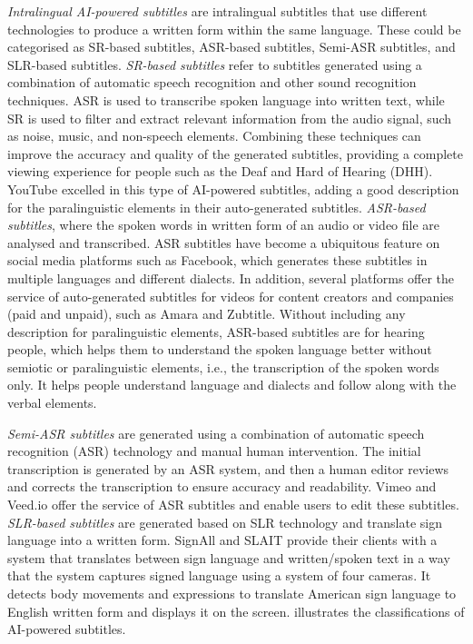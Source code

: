 \documentclass[english]{textolivre}
\begin{document}
\emph{Intralingual AI-powered subtitles} are intralingual subtitles that
use different technologies to produce a written form within the same
language. These could be categorised as SR-based subtitles, ASR-based
subtitles, Semi-ASR subtitles, and SLR-based subtitles. \emph{SR-based
	subtitles} refer to subtitles generated using a combination of automatic
speech recognition and other sound recognition techniques. ASR is used
to transcribe spoken language into written text, while SR is used to
filter and extract relevant information from the audio signal, such as
noise, music, and non-speech elements. Combining these techniques can
improve the accuracy and quality of the generated subtitles, providing a
complete viewing experience for people such as the Deaf and Hard of
Hearing (DHH). YouTube excelled in this type of AI-powered subtitles,
adding a good description for the paralinguistic elements in their
auto-generated subtitles. \emph{ASR-based subtitles}, where the
spoken words in written form of an audio or video file are analysed and
transcribed. ASR subtitles have become a ubiquitous feature on social
media platforms such as Facebook, which generates these subtitles in
multiple languages and different dialects. In addition, several
platforms offer the service of auto-generated subtitles for videos for
content creators and companies (paid and unpaid), such as Amara and
Zubtitle. Without including any description for paralinguistic elements,
ASR-based subtitles are for hearing people, which helps them to
understand the spoken language better without semiotic or paralinguistic
elements, i.e., the transcription of the spoken words only. It helps
people understand language and dialects and follow along with the verbal
elements.

\emph{Semi-ASR subtitles} are generated using a combination of automatic
speech recognition (ASR) technology and manual human intervention. The
initial transcription is generated by an ASR system, and then a human
editor reviews and corrects the transcription to ensure accuracy and
readability. Vimeo and Veed.io offer the service of ASR subtitles and
enable users to edit these subtitles. \emph{SLR-based subtitles} are
generated based on SLR technology and translate sign language into a
written form. SignAll and SLAIT provide their clients with a system that
translates between sign language and written/spoken text in a way that
the system captures signed language using a system of four cameras. It
detects body movements and expressions to translate American sign
language to English written form and displays it on the screen. 
illustrates the classifications of AI-powered subtitles.
\end{document}

